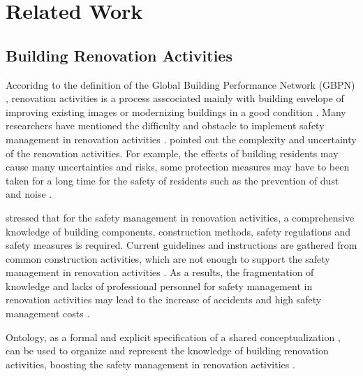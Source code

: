 \section{Related Work}
\label{sec:related_work}  
\subsection*{Building Renovation Activities}
Accoridng to the definition of the Global Building Performance Network (GBPN) \cite[]{shnapp2013deep},  
renovation activities is a process asscociated mainly with building envelope of improving existing images or modernizing buildings in a good condition \cite[]{amorocho2021reno}.
Many researchers have mentioned the difficulty and obstacle to implement safety management in renovation activities \cite[]{doukari2024ontology,amorocho2021reno}.
\cite{singh2014investigation,salvalai2017deep} pointed out the complexity and uncertainty of the renovation activities. 
For example, the effects of building residents may cause many uncertainties and risks, some protection measures may have to been taken for a long time for the safety of residents such as the prevention of dust and noise \cite[]{salvalai2017deep}.

\cite{doukari2024ontology,amorocho2021reno} stressed that for the safety management in renovation activities, a comprehensive knowledge of building components, construction methods, safety regulations and safety measures is required.
 Current guidelines and instructions \cite[]{xu2023comparative,arena2016construction} are gathered from common construction activities, which are not enough to support the safety management in renovation activities \cite[]{doukari2024ontology}.
As a results, the fragmentation of knowledge and lacks of professional personnel for safety management in renovation activities 
may lead to the increase of accidents and high safety management costs \cite[]{buser2019interactive,rodger2019integration}.

Ontology, as a formal and explicit specification of a shared conceptualization \cite[]{gruber1995toward}, 
can be used to organize and represent the knowledge of building renovation activities, boosting the safety management in renovation activities \cite[]{doukari2024ontology,amorocho2021reno}.

